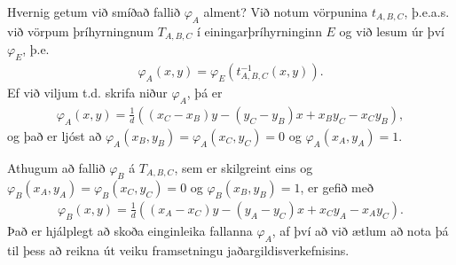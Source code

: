 \documentclass[a4paper,10pt,icelandic]{sphinxmanual}
\begin{document}
Hvernig getum við smíðað fallið \(\varphi_A\) alment? Við notum vörpunina \(t_{A,B,C}\), þ.e.a.s. við vörpum þríhyrningnum \(T_{A,B,C}\) í einingarþríhyrninginn \(E\) og við lesum úr því \(\varphi_E\), þ.e.
\begin{equation*}
\begin{split}\varphi_A(x,y)=\varphi_E(t_{A,B,C}^{-1}(x,y)).\end{split}
\end{equation*}
Ef við viljum t.d. skrifa niður \(\varphi_A\), þá er
\begin{equation}\label{equation:Kafli06:eq.defvarphiA}
\begin{split}\varphi_A(x,y)=\tfrac 1d \left((x_C-x_B)y-(y_C-y_B)x+x_B y_C-x_C y_B\right),\end{split}
\end{equation}
og það er ljóst að \(\varphi_A(x_B,y_B)=\varphi_A(x_C,y_C)=0\) og \(\varphi_A(x_A,y_A)=1\).

Athugum að fallið \(\varphi_B\) á \(T_{A,B,C}\), sem er skilgreint eins og \(\varphi_B(x_A,y_A)=\varphi_B(x_C,y_C)=0\) og \(\varphi_B(x_B,y_B)=1\), er gefið með
\begin{equation}\label{equation:Kafli06:eq.defvarphiB}
\begin{split}\varphi_B(x,y)=\tfrac 1d \left((x_A-x_C)y-(y_A-y_C)x+x_C y_A-x_A y_C\right).\end{split}
\end{equation}
Það er hjálplegt að skoða einginleika fallanna \(\varphi_A\), af því að við ætlum að nota þá til þess að reikna út veiku framsetningu jaðargildisverkefnisins.

\end{document}
